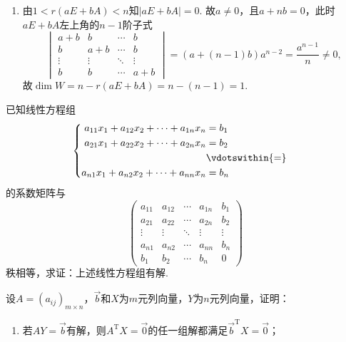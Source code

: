 \begin{exercise}
\begin{exgroup}
\begin{answer}
\begin{enumerate}
                \item 由$1<r(aE+bA)<n$知$|aE+bA|=0$. 故$a\neq 0$，且$a+nb=0$，此时$aE+bA$左上角的$n-1$阶子式
                      \[ \begin{vmatrix}
                              a+b    & b      & \cdots & b      \\
                              b      & a+b    & \cdots & b      \\
                              \vdots & \vdots & \ddots & \vdots \\
                              b      & b      & \cdots & a+b
                          \end{vmatrix}=(a+(n-1)b)a^{n-2}=\frac{a^{n-1}}{n}\neq 0, \]
                      故$\dim{W}=n-r(aE+bA)=n-(n-1)=1$.
            \end{enumerate}
        \end{answer}

        \item 已知线性方程组
        \[\begin{cases} \begin{aligned}
                    a_{11}x_1+a_{12}x_2+\cdots+a_{1n}x_n & =b_1            \\
                    a_{21}x_1+a_{22}x_2+\cdots+a_{2n}x_n & =b_2            \\
                                                         & \vdotswithin{=} \\
                    a_{n1}x_1+a_{n2}x_2+\cdots+a_{nn}x_n & =b_n            \\
                \end{aligned} \end{cases}\]
        的系数矩阵与
        \[\begin{pmatrix}
                a_{11} & a_{12} & \cdots & a_{1n} & b_1    \\
                a_{21} & a_{22} & \cdots & a_{2n} & b_2    \\
                \vdots & \vdots & \ddots & \vdots & \vdots \\
                a_{n1} & a_{n2} & \cdots & a_{nn} & b_n    \\
                b_1    & b_2    & \cdots & b_n    & 0
            \end{pmatrix}\]
        秩相等，求证：上述线性方程组有解.

        \item 设$A=(a_{ij})_{m\times n}$，$\vec{b}$和$X$为$m$元列向量，$Y$为$n$元列向量，证明：
        \begin{enumerate}
            \item 若$AY=\vec{b}$有解，则$A^\mathrm{T}X=\vec{0}$的任一组解都满足$\vec{b}^\mathrm{T}X=\vec{0}$；


\end{enumerate}
\end{exgroup}
\end{exercise}
